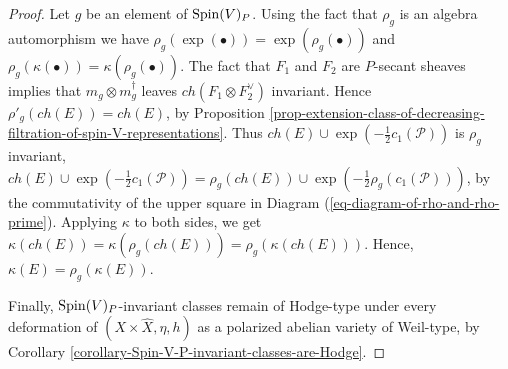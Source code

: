 \documentclass[12pt]{amsart}
\numberwithin{equation}{subsection}
\theoremstyle{plain}
\theoremstyle{definition}
\newcommand{\RR}{{\mathbb R}}
\renewcommand{\P}{{\mathcal P}}
\newcommand{\Spin}{{\rm Spin}}
\begin{document}
\begin{proof}
Let $g$ be an element of $\Spin(V)_P$. 
Using the fact that $\rho_g$ is an algebra automorphism we have $\rho_g(\exp(\bullet))=\exp(\rho_g(\bullet))$
and $\rho_g(\kappa(\bullet))=\kappa(\rho_g(\bullet))$.
The fact that $F_1$ and $F_2$ are  $P$-secant sheaves implies that $m_g\otimes m_g^\dagger$ leaves $ch(F_1\otimes F_2^\vee)$ invariant. 
Hence $\rho'_g(ch(E))=ch(E)$, 
by Proposition \ref{prop-extension-class-of-decreasing-filtration-of-spin-V-representations}. 
Thus $ch(E)\cup\exp\left(-\frac{1}{2}c_1(\P)\right)$ is $\rho_g$ invariant,
$ch(E)\cup\exp\left(-\frac{1}{2}c_1(\P)\right)=\rho_g(ch(E))\cup\exp\left(-\frac{1}{2}\rho_g(c_1(\P))\right)$, by the commutativity of the upper square in Diagram (\ref{eq-diagram-of-rho-and-rho-prime}).
Applying $\kappa$ to both sides, we get $\kappa(ch(E))=\kappa(\rho_g(ch(E)))=\rho_g(\kappa(ch(E))).$
Hence, $\kappa(E)=\rho_g(\kappa(E))$.

Finally, $\Spin(V)_P$-invariant classes remain of Hodge-type under every deformation of 
$(X\times\hat{X},\eta,h)$  as a polarized abelian variety of Weil-type, by
Corollary \ref{corollary-Spin-V-P-invariant-classes-are-Hodge}.
\end{proof}

% 


% 
\end{document}
